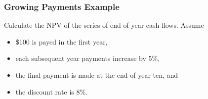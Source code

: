 \documentclass{beamer}
\begin{document}
\begin{frame}[t]
\frametitle{Growing Payments Example}
\tiny
\begin{Example}
Calculate the NPV of the series of end-of-year cash flows. Assume 
\begin{itemize}
\item \$100 is payed in the first year,
\item each subsequent year payments increase by 5\%, 
\item the final payment is made at the end of year ten, and
\item the discount rate is 8\%.
\end{itemize} 
\end{Example}

\end{frame}
\end{document}
